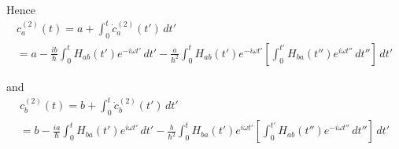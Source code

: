 Hence
\begin{multline*}
c_a^{(2)}(t)=a+\int_0^t\dot c_a^{(2)}(t')\,dt'
\\
=a-\frac{ib}{\hbar}\int_0^tH_{ab}(t')e^{-i\omega t'}\,dt'
-\frac{a}{\hbar^2}\int_0^tH_{ab}(t')e^{-i\omega t'}
\left[\int_0^{t'}H_{ba}(t'')e^{i\omega t''}\,dt''\right]\,dt'
\tag{4}
\end{multline*}

and
\begin{multline*}
c_b^{(2)}(t)=b+\int_0^t\dot c_b^{(2)}(t')\,dt'
\\
=b-\frac{ia}{\hbar}\int_0^tH_{ba}(t')e^{i\omega t'}\,dt'
-\frac{b}{\hbar^2}\int_0^tH_{ba}(t')e^{i\omega t'}
\left[\int_0^{t'}H_{ab}(t'')e^{-i\omega t''}\,dt''\right]\,dt'
\tag{5}
\end{multline*}


